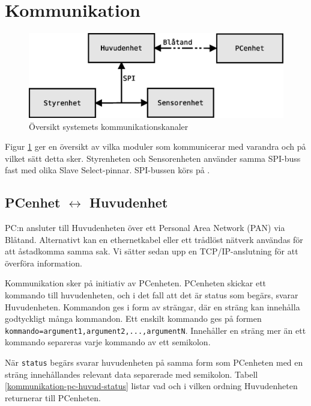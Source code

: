 \section{Kommunikation}


\begin{figure}[h!]
	\centering
	\includegraphics[scale=0.4]{grafik/kommunikation-oversikt}
	\caption{Översikt systemets kommunikationskanaler} \label{kommunikation-oversikt}
\end{figure}

Figur \ref{kommunikation-oversikt} ger en översikt av vilka moduler som kommunicerar med varandra och på vilket sätt detta sker. Styrenheten och Sensorenheten använder samma SPI-buss fast med olika Slave Select-pinnar. SPI-bussen körs på .

\subsection{PCenhet $\longleftrightarrow$ Huvudenhet}

PC:n ansluter till Huvudenheten över ett Personal Area Network (PAN) via Blåtand. Alternativt kan en ethernetkabel eller ett trådlöst nätverk användas för att åstadkomma samma sak. Vi sätter sedan upp en TCP/IP-anslutning för att överföra information.

Kommunikation sker på initiativ av PCenheten. PCenheten skickar ett kommando till huvudenheten, och i det fall att det är status som begärs, svarar Huvudenheten. Kommandon ges i form av strängar, där en sträng kan innehålla godtyckligt många kommandon. Ett enskilt kommando ges på formen \texttt{kommando=argument1,argument2,...,argumentN}. Innehåller en sträng mer än ett kommando separeras varje kommando av ett semikolon.

När \texttt{status} begärs svarar huvudenheten på samma form som PCenheten med en sträng innehållandes relevant data separerade med semikolon. Tabell \ref{kommunikation-pc-huvud-status} listar vad och i vilken ordning Huvudenheten returnerar till PCenheten.

